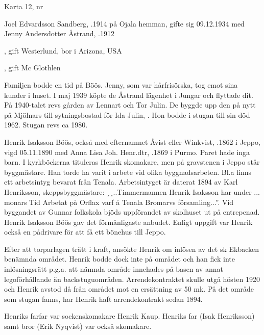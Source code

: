 Karta 12,   nr 

Joel Edvardsson Sandberg, .1914 på Ojala hemman, gifte sig 09.12.1934 med Jenny Andersdotter Åstrand, .1912
\begin{jhchildren}
  \item {}, gift Westerlund, bor i Arizona, USA
  \item {}, gift Mc Glothlen
\end{jhchildren}
Familjen bodde en tid på Böös. Jenny, som var hårfrisörska, tog emot sina kunder i huset. I maj 1939 köpte de Åstrand lägenhet i Jungar och flyttade dit. På 1940-talet revs gården av Lennart och Tor Julin. De byggde upp den på nytt på Mjölnars till sytningsbostad för Ida Julin, . Hon bodde i stugan till sin död 1962. Stugan revs ca 1980.


Henrik Isaksson Böös, också med efternamnet Åvist eller Winkvist, .1862 i Jeppo, vigd 05.11.1890 med Anna Lisa Joh. Henr.dtr, .1869 i Purmo. Paret hade inga barn. I kyrkböckerna tituleras Henrik skomakare, men på gravstenen i Jeppo står byggmästare. Han torde ha varit i arbete vid olika byggnadsarbeten. Bl.a finns ett arbetsintyg bevarat från Tenala. Arbetsintyget är daterat 1894 av Karl Henriksson, skeppsbyggmästare: ¸¸..Timmermannen Henrik Isaksson har under ... monars Tid Arbetat på Orflax varf å Tenala Bromarvs församling...''. Vid byggandet av Gunnar folkskola bjöds uppförandet av skolhuset ut på entrepenad. Henrik Isaksson Böös gav det förmånligaste anbudet. Enligt uppgift var Henrik också en pådrivare för att få ett bönehus till Jeppo.

Efter att torparlagen trätt i kraft, ansökte Henrik om inlösen av det sk Ekbacken benämnda området. Henrik bodde dock inte på området och han fick inte inlösningsrätt p.g.a. att nämnda område innehades på basen av annat legoförhållande än backstuguområden. Arrendekontraktet skulle utgå hösten 1920 och Henrik avstod då från området mot en ersättning av 50 mk. På det område som stugan fanns, har Henrik haft arrendekontrakt sedan 1894.

Henriks farfar var sockenskomakare Henrik Kaup. Henriks far (Isak Henriksson) samt bror (Erik Nyqvist) var också skomakare.

